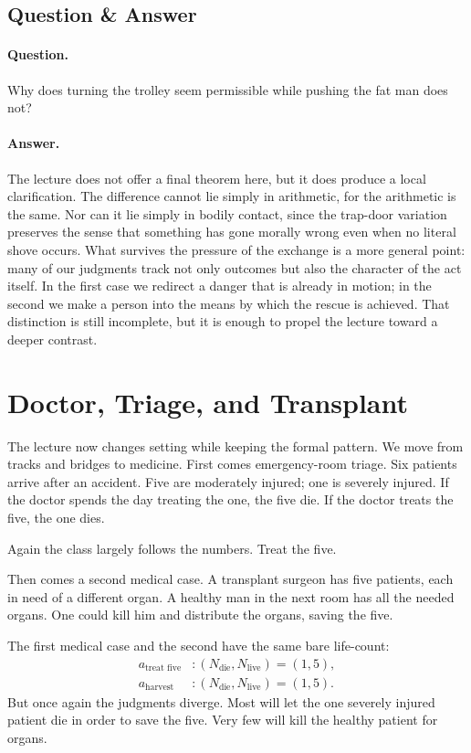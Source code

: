 \subsection{Question \& Answer}

\paragraph{Question.} Why does turning the trolley seem permissible while pushing the fat man does not?

\paragraph{Answer.} The lecture does not offer a final theorem here, but it does produce a local clarification. The difference cannot lie simply in arithmetic, for the arithmetic is the same. Nor can it lie simply in bodily contact, since the trap-door variation preserves the sense that something has gone morally wrong even when no literal shove occurs. What survives the pressure of the exchange is a more general point: many of our judgments track not only outcomes but also the character of the act itself. In the first case we redirect a danger that is already in motion; in the second we make a person into the means by which the rescue is achieved. That distinction is still incomplete, but it is enough to propel the lecture toward a deeper contrast.

\section{Doctor, Triage, and Transplant}

The lecture now changes setting while keeping the formal pattern. We move from tracks and bridges to medicine. First comes emergency-room triage. Six patients arrive after an accident. Five are moderately injured; one is severely injured. If the doctor spends the day treating the one, the five die. If the doctor treats the five, the one dies.

Again the class largely follows the numbers. Treat the five.

Then comes a second medical case. A transplant surgeon has five patients, each in need of a different organ. A healthy man in the next room has all the needed organs. One could kill him and distribute the organs, saving the five.

The first medical case and the second have the same bare life-count:
\begin{align}
a_{\text{treat five}} &: (N_{\text{die}},N_{\text{live}}) = (1,5), \\
a_{\text{harvest}} &: (N_{\text{die}},N_{\text{live}}) = (1,5).
\end{align}
But once again the judgments diverge. Most will let the one severely injured patient die in order to save the five. Very few will kill the healthy patient for organs.

